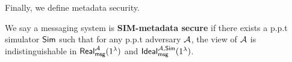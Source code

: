 Finally, we define metadata security.

\begin{definition}
\label{defn:messaging-security}
We say a messaging system is \textbf{SIM-metadata secure} if there exists a p.p.t simulator $\mathsf{Sim}$ such that for any p.p.t adversary $\mathcal{A}$, the view of $\mathcal{A}$ is indistinguishable in $\mathsf{Real}_{\mathsf{msg}}^{\mathcal{A}}(1^{\lambda})$ and $\mathsf{Ideal}^{\mathcal{A}, \mathsf{\mathsf{Sim}}}_{\mathsf{msg}}(1^{\lambda})$.
\end{definition}


